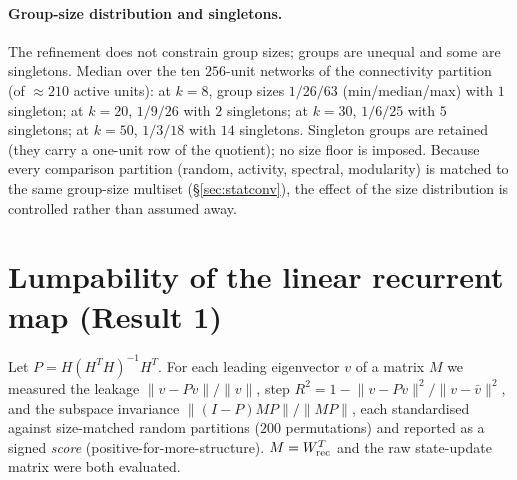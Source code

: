 \documentclass[11pt]{article}
\begin{document}
\paragraph{Group-size distribution and singletons.} The refinement does not constrain group
sizes; groups are unequal and some are singletons. Median over the ten $256$-unit networks of the
connectivity partition (of $\approx210$ active units): at $k=8$, group sizes $1/26/63$
(min/median/max) with $1$ singleton; at $k=20$, $1/9/26$ with $2$ singletons; at $k=30$,
$1/6/25$ with $5$ singletons; at $k=50$, $1/3/18$ with $14$ singletons. Singleton groups are
retained (they carry a one-unit row of the quotient); no size floor is imposed. Because every
comparison partition (random, activity, spectral, modularity) is matched to the same group-size
multiset (\S\ref{sec:statconv}), the effect of the size distribution is controlled rather than
assumed away.

\section{Lumpability of the linear recurrent map (Result 1)}
\label{sec:lump}
Let $P=H(H^{T}H)^{-1}H^{T}$. For each leading eigenvector $v$ of a matrix $M$ we measured the
leakage $\lVert v-Pv\rVert/\lVert v\rVert$, step $R^{2}=1-\lVert v-Pv\rVert^{2}/\lVert v-\bar
v\rVert^{2}$, and the subspace invariance $\lVert(I-P)MP\rVert/\lVert MP\rVert$, each
standardised against size-matched random partitions ($200$ permutations) and reported as a
signed \emph{score} (positive-for-more-structure). $M=W_{\rm rec}^{T}$ and the raw state-update
matrix were both evaluated.
\end{document}
